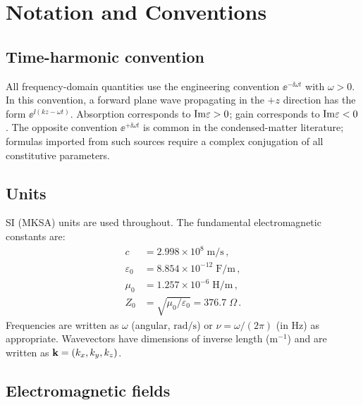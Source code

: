 
\chapter*{Notation and Conventions}

\section*{Time-harmonic convention}

All frequency-domain quantities use the engineering convention
$\ee^{-\ii\omega t}$ with $\omega>0$.  In this convention, a forward
plane wave propagating in the $+z$ direction has the form
$\ee^{\ii(kz-\omega t)}$.  Absorption corresponds to
$\mathrm{Im}\varepsilon>0$; gain corresponds to $\mathrm{Im}\varepsilon<0$.  The opposite convention $\ee^{+\ii\omega t}$
is common in the condensed-matter literature; formulas imported from
such sources require a complex conjugation of all constitutive
parameters.

\section*{Units}

SI (MKSA) units are used throughout.  The fundamental electromagnetic
constants are:
\begin{align}
  c &= 2.998\times 10^8\;\mathrm{m/s}\,,\\
  \varepsilon_0 &= 8.854\times 10^{-12}\;\mathrm{F/m}\,,\\
  \mu_0 &= 1.257\times 10^{-6}\;\mathrm{H/m}\,,\\
  Z_0 &= \sqrt{\mu_0/\varepsilon_0} = 376.7\;\Omega\,.
\end{align}
Frequencies are written as $\omega$ (angular, $\mathrm{rad/s}$) or
$\nu=\omega/(2\pi)$ (in Hz) as appropriate.  Wavevectors have
dimensions of inverse length ($\mathrm{m}^{-1}$) and are written
as $\mathbf{k}=(k_x,k_y,k_z)$.

\section*{Electromagnetic fields}

